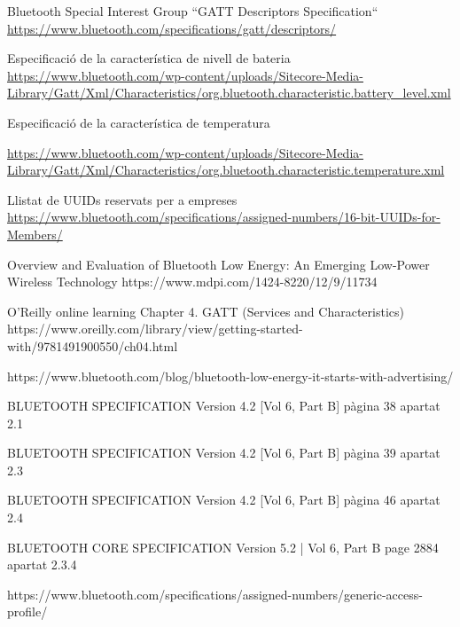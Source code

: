 \begin{thebibliography}{2}
Bluetooth Special Interest Group
``GATT Descriptors Specification``
\href{https://www.bluetooth.com/specifications/gatt/descriptors/}{https://www.bluetooth.com/specifications/gatt/descriptors/}

Especificació de la característica de nivell de bateria
\href{https://www.bluetooth.com/wp-content/uploads/Sitecore-Media-Library/Gatt/Xml/Characteristics/org.bluetooth.characteristic.battery\_level.xml}{https://www.bluetooth.com/wp-content/uploads/Sitecore-Media-Library/Gatt/Xml/Characteristics/org.bluetooth.characteristic.battery\_level.xml}

Especificació de la característica de temperatura

\href{https://www.bluetooth.com/wp-content/uploads/Sitecore-Media-Library/Gatt/Xml/Characteristics/org.bluetooth.characteristic.temperature.xml}{https://www.bluetooth.com/wp-content/uploads/Sitecore-Media-Library/Gatt/Xml/Characteristics/org.bluetooth.characteristic.temperature.xml}

Llistat de UUIDs reservats per a empreses
\href{https://www.bluetooth.com/specifications/assigned-numbers/16-bit-UUIDs-for-Members/}{https://www.bluetooth.com/specifications/assigned-numbers/16-bit-UUIDs-for-Members/}

Overview and Evaluation of Bluetooth Low Energy: An Emerging Low-Power Wireless Technology
https://www.mdpi.com/1424-8220/12/9/11734

O’Reilly online learning
Chapter 4. GATT (Services and Characteristics)
https://www.oreilly.com/library/view/getting-started-with/9781491900550/ch04.html

https://www.bluetooth.com/blog/bluetooth-low-energy-it-starts-with-advertising/

BLUETOOTH SPECIFICATION Version 4.2 [Vol 6, Part B] pàgina 38 apartat 2.1

BLUETOOTH SPECIFICATION Version 4.2 [Vol 6, Part B] pàgina 39 apartat 2.3

BLUETOOTH SPECIFICATION Version 4.2 [Vol 6, Part B] pàgina 46 apartat 2.4

BLUETOOTH CORE SPECIFICATION Version 5.2 | Vol 6, Part B  page 2884 apartat 2.3.4	

https://www.bluetooth.com/specifications/assigned-numbers/generic-access-profile/


\end{thebibliography}
